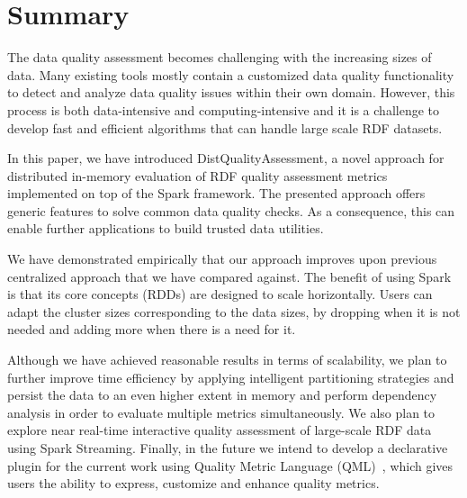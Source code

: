 \section{Summary}
\label{sec:distqualityassesment-summary}
The data quality assessment becomes challenging with the increasing sizes of data.
Many existing tools mostly contain a customized data quality functionality to detect and analyze data quality issues within their own domain. 
However, this process is both data-intensive and computing-intensive and it is a challenge to develop fast and efficient algorithms that can handle large scale RDF datasets.

In this paper, we have introduced DistQualityAssessment, a novel approach for distributed in-memory evaluation of RDF quality assessment metrics implemented on top of the Spark framework.
The presented approach offers generic features to solve common data quality checks.
As a consequence, this can enable further applications to build trusted data utilities. 

We have demonstrated empirically that our approach improves upon previous centralized approach that we have compared against.
The benefit of using Spark is that its core concepts (RDDs) are designed to scale horizontally. Users can adapt the cluster sizes corresponding to the data sizes, by dropping when it is not needed and adding more when there is a need for it.

Although we have achieved reasonable results in terms of scalability, we plan to further improve time efficiency by applying intelligent partitioning strategies and persist the data to an even higher extent in memory and perform dependency analysis in order to evaluate multiple metrics simultaneously. We also plan to explore near real-time interactive quality assessment of large-scale RDF data using Spark Streaming.
Finally, in the future we intend to develop a declarative plugin for the current work using Quality Metric Language (QML)~\cite{debattista2016luzzu}, which gives users the ability to express, customize and enhance quality metrics.






